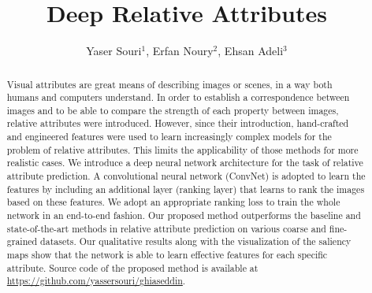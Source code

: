\documentclass[runningheads]{llncs}
\begin{document}
\newcommand{\point}{
    \raise0.7ex\hbox{.}
    }


\pagestyle{headings}

\mainmatter

\title{Deep Relative Attributes} %



\author{Yaser Souri$^1$, Erfan Noury$^2$, Ehsan Adeli$^3$} %



\maketitle

\begin{abstract}
Visual attributes are great means of describing images or scenes, in a way both humans and computers understand. In order to establish a correspondence between images and to be able to compare the strength of each property between images, relative attributes were introduced. However, since their introduction, hand-crafted and engineered features were used to learn increasingly complex models for the problem of relative attributes. This limits the applicability of those methods for more realistic cases. We introduce a deep neural network architecture for the task of relative attribute prediction. A convolutional neural network (ConvNet) is adopted to learn the features by including an additional layer (ranking layer) that learns to rank the images based on these features. We adopt an appropriate ranking loss to train the whole network in an end-to-end fashion. Our proposed method outperforms the baseline and state-of-the-art methods in relative attribute prediction on various coarse and fine-grained datasets. Our qualitative results along with the visualization of the saliency maps show that the network is able to learn effective features for each specific attribute. Source code of the proposed method is available at \href{https://github.com/yassersouri/ghiaseddin}{https://github.com/yassersouri/ghiaseddin}.
\end{abstract}
\end{document}
